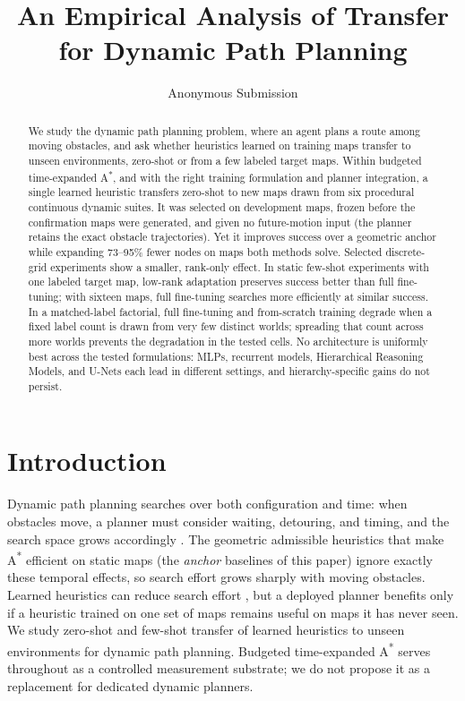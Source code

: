 \documentclass[letterpaper]{article} %
\title{An Empirical Analysis of Transfer for Dynamic Path Planning}
\author{
    Anonymous Submission
}
\begin{document}
\maketitle

\begin{abstract}
We study the dynamic path planning problem, where an agent plans a route among moving obstacles, and ask whether heuristics learned on training maps transfer to unseen environments, zero-shot or from a few labeled target maps. Within budgeted time-expanded A\textsuperscript{*}, and with the right training formulation and planner integration, a single learned heuristic transfers zero-shot to new maps drawn from six procedural continuous dynamic suites. It was selected on development maps, frozen before the confirmation maps were generated, and given no future-motion input (the planner retains the exact obstacle trajectories). Yet it improves success over a geometric anchor while expanding 73--95\% fewer nodes on maps both methods solve. Selected discrete-grid experiments show a smaller, rank-only effect. In static few-shot experiments with one labeled target map, low-rank adaptation preserves success better than full fine-tuning; with sixteen maps, full fine-tuning searches more efficiently at similar success. In a matched-label factorial, full fine-tuning and from-scratch training degrade when a fixed label count is drawn from very few distinct worlds; spreading that count across more worlds prevents the degradation in the tested cells. No architecture is uniformly best across the tested formulations: MLPs, recurrent models, Hierarchical Reasoning Models, and U-Nets each lead in different settings, and hierarchy-specific gains do not persist.
\end{abstract}

\section{Introduction}

Dynamic path planning searches over both configuration and time: when obstacles move, a planner must consider waiting, detouring, and timing, and the search space grows accordingly \citep{silver2005cooperative,phillips2011sipp}. The geometric admissible heuristics that make A\textsuperscript{*} \citep{hart1968astar} efficient on static maps (the \emph{anchor} baselines of this paper) ignore exactly these temporal effects, so search effort grows sharply with moving obstacles. Learned heuristics can reduce search effort \citep{arfaee2011bootstrap,bhardwaj2017sail,yonetani2021neuralastar}, but a deployed planner benefits only if a heuristic trained on one set of maps remains useful on maps it has never seen. We study zero-shot and few-shot transfer of learned heuristics to unseen environments for dynamic path planning. Budgeted time-expanded A\textsuperscript{*} serves throughout as a controlled measurement substrate; we do not propose it as a replacement for dedicated dynamic planners.
\end{document}
